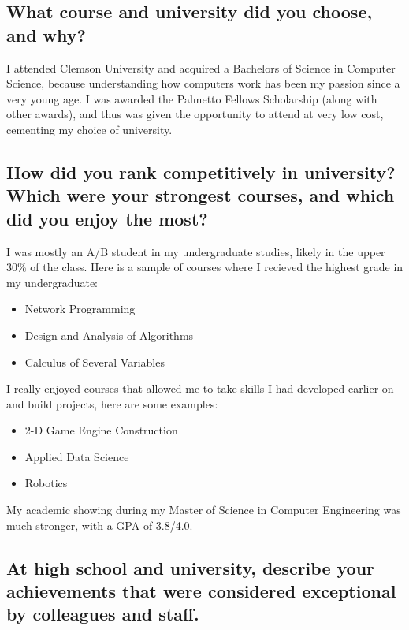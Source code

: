 \documentclass{article}
\begin{document}
\subsection{What course and university did you choose, and why?}

I attended Clemson University and acquired a Bachelors of Science in Computer
Science, because understanding how computers work has been my passion since a
very young age. I was awarded the Palmetto Fellows Scholarship (along with other
awards), and thus was given the opportunity to attend at very low cost, cementing
my choice of university.

\subsection{How did you rank competitively in university? Which were your
  strongest courses, and which did you enjoy the most?}

I was mostly an A/B student in my undergraduate studies, likely in the upper
30\% of the class. Here is a sample of courses where I recieved the highest
grade in my undergraduate:
\begin{itemize}
  \item Network Programming
  \item Design and Analysis of Algorithms
  \item Calculus of Several Variables
\end{itemize}

I really enjoyed courses that allowed me to take skills I had developed earlier on and build projects, here are some examples:
\begin{itemize}
  \item 2-D Game Engine Construction
  \item Applied Data Science
  \item Robotics
\end{itemize}

My academic showing during my Master of Science in Computer Engineering was much stronger, with a GPA of 3.8/4.0.

\subsection{At high school and university, describe your achievements that were
  considered exceptional by colleagues and staff.}
\end{document}
